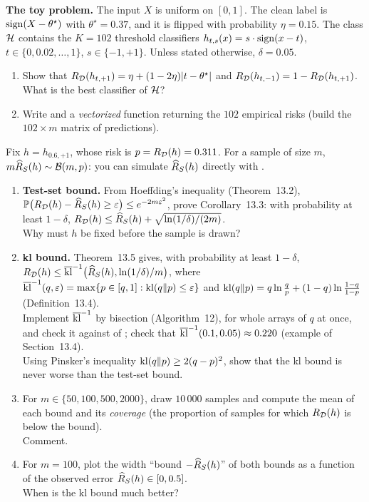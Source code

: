 \documentclass[a4paper,11pt]{article}
\begin{document}
\medskip
\noindent\textbf{The toy problem.} The input $X$ is uniform on $[0,1]$. The clean label is $\operatorname{sign}(X-\theta^\star)$ with
$\theta^\star=0.37$, and it is flipped with probability $\eta=0.15$. The class $\mathcal{H}$ contains the $K=102$ threshold
classifiers $h_{t,s}(x)=s\cdot\operatorname{sign}(x-t)$, $t\in\{0,0.02,\dots,1\}$, $s\in\{-1,+1\}$. Unless stated otherwise,
$\delta=0.05$.

\begin{enumerate}
\item Show that $R_{\mathcal{D}}(h_{t,+1})=\eta+(1-2\eta)|t-\theta^\star|$ and $R_{\mathcal{D}}(h_{t,-1})=1-R_{\mathcal{D}}(h_{t,+1})$.\\
      What is the best classifier of $\mathcal{H}$?
\item Write  and a \emph{vectorized} function  returning the $102$
      empirical risks (build the $102\times m$ matrix of predictions).
\end{enumerate}

\label{p4:fixed}

Fix $h=h_{0.6,+1}$, whose risk is $p=R_{\mathcal{D}}(h)=0.311$. For a sample of size $m$, $m\widehat{R}_{S}(h)\sim\mathcal B(m,p)$: you can
simulate $\widehat{R}_{S}(h)$ directly with .

\begin{enumerate}
\item \textbf{Test-set bound.} From Hoeffding's inequality (Theorem~13.2),
      $\mathbb{P}\big(R_{\mathcal{D}}(h)-\widehat{R}_{S}(h)\geq\varepsilon\big)\leq e^{-2m\varepsilon^2}$, prove Corollary~13.3: with probability at least
      $1-\delta$, $R_{\mathcal{D}}(h)\leq\widehat{R}_{S}(h)+\sqrt{\ln(1/\delta)/(2m)}$.\\
      Why must $h$ be fixed before the sample is drawn?
\item \textbf{kl bound.} Theorem~13.5 gives, with probability at least $1-\delta$,
      $R_{\mathcal{D}}(h)\leq\overline{\operatorname{kl}}^{-1}\big(\widehat{R}_{S}(h),\ln(1/\delta)/m\big)$, where
      $\overline{\operatorname{kl}}^{-1}(q,\varepsilon)=\max\{p\in[q,1]:\operatorname{kl}(q\|p)\leq\varepsilon\}$ and $\operatorname{kl}(q\|p)=q\ln\frac qp+(1-q)\ln\frac{1-q}{1-p}$
      (Definition~13.4).\\
      Implement $\overline{\operatorname{kl}}^{-1}$ by bisection (Algorithm~12), for whole arrays of $q$ at once, and check it against
       of ; check that $\overline{\operatorname{kl}}^{-1}(0.1,0.05)\approx0.220$ (example of
      Section~13.4).\\
      Using Pinsker's inequality $\operatorname{kl}(q\|p)\geq2(q-p)^2$, show that the kl bound is never worse than the test-set bound.
\item For $m\in\{50,100,500,2000\}$, draw $10\,000$ samples and compute the mean of each bound and its \emph{coverage}
      (the proportion of samples for which $R_{\mathcal{D}}(h)$ is below the bound).\\
      Comment.
\item For $m=100$, plot the width ``bound $-\widehat{R}_{S}(h)$'' of both bounds as a function of the observed error
      $\widehat{R}_{S}(h)\in[0,0.5]$.\\
      When is the kl bound much better?
\end{enumerate}
\end{document}
